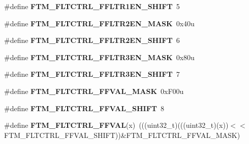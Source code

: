 \begin{DoxyCompactItemize}
\item 
\#define {\bfseries F\+T\+M\+\_\+\+F\+L\+T\+C\+T\+R\+L\+\_\+\+F\+F\+L\+T\+R1\+E\+N\+\_\+\+S\+H\+I\+FT}~5\hypertarget{group__FTM__Register__Masks_gaa027617739dc7dbcc2f709d42941257e}{}\label{group__FTM__Register__Masks_gaa027617739dc7dbcc2f709d42941257e}

\item 
\#define {\bfseries F\+T\+M\+\_\+\+F\+L\+T\+C\+T\+R\+L\+\_\+\+F\+F\+L\+T\+R2\+E\+N\+\_\+\+M\+A\+SK}~0x40u\hypertarget{group__FTM__Register__Masks_gaf2c71dfc0e67908acb3818cdb38f7097}{}\label{group__FTM__Register__Masks_gaf2c71dfc0e67908acb3818cdb38f7097}

\item 
\#define {\bfseries F\+T\+M\+\_\+\+F\+L\+T\+C\+T\+R\+L\+\_\+\+F\+F\+L\+T\+R2\+E\+N\+\_\+\+S\+H\+I\+FT}~6\hypertarget{group__FTM__Register__Masks_ga74a686a0b3a50cc05515e7948446722e}{}\label{group__FTM__Register__Masks_ga74a686a0b3a50cc05515e7948446722e}

\item 
\#define {\bfseries F\+T\+M\+\_\+\+F\+L\+T\+C\+T\+R\+L\+\_\+\+F\+F\+L\+T\+R3\+E\+N\+\_\+\+M\+A\+SK}~0x80u\hypertarget{group__FTM__Register__Masks_gae2c942a53916267eea52d5eaa1fd9db0}{}\label{group__FTM__Register__Masks_gae2c942a53916267eea52d5eaa1fd9db0}

\item 
\#define {\bfseries F\+T\+M\+\_\+\+F\+L\+T\+C\+T\+R\+L\+\_\+\+F\+F\+L\+T\+R3\+E\+N\+\_\+\+S\+H\+I\+FT}~7\hypertarget{group__FTM__Register__Masks_ga03854a8ffab858afd4a9594b185faead}{}\label{group__FTM__Register__Masks_ga03854a8ffab858afd4a9594b185faead}

\item 
\#define {\bfseries F\+T\+M\+\_\+\+F\+L\+T\+C\+T\+R\+L\+\_\+\+F\+F\+V\+A\+L\+\_\+\+M\+A\+SK}~0x\+F00u\hypertarget{group__FTM__Register__Masks_gaca5b1d8eaedb1a55c4cc3be2d17ac80d}{}\label{group__FTM__Register__Masks_gaca5b1d8eaedb1a55c4cc3be2d17ac80d}

\item 
\#define {\bfseries F\+T\+M\+\_\+\+F\+L\+T\+C\+T\+R\+L\+\_\+\+F\+F\+V\+A\+L\+\_\+\+S\+H\+I\+FT}~8\hypertarget{group__FTM__Register__Masks_gae69c26ba52bfb04edf52ec6574af426e}{}\label{group__FTM__Register__Masks_gae69c26ba52bfb04edf52ec6574af426e}

\item 
\#define {\bfseries F\+T\+M\+\_\+\+F\+L\+T\+C\+T\+R\+L\+\_\+\+F\+F\+V\+AL}(x)~(((uint32\+\_\+t)(((uint32\+\_\+t)(x))$<$$<$F\+T\+M\+\_\+\+F\+L\+T\+C\+T\+R\+L\+\_\+\+F\+F\+V\+A\+L\+\_\+\+S\+H\+I\+FT))\&F\+T\+M\+\_\+\+F\+L\+T\+C\+T\+R\+L\+\_\+\+F\+F\+V\+A\+L\+\_\+\+M\+A\+SK)\hypertarget{group__FTM__Register__Masks_ga2d74d328f8b0e1bf184935031c644ae7}{}\label{group__FTM__Register__Masks_ga2d74d328f8b0e1bf184935031c644ae7}


\end{DoxyCompactItemize}
